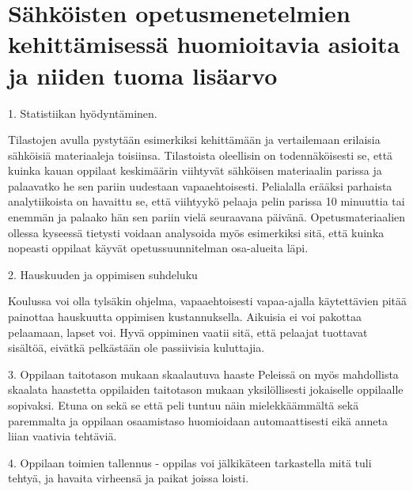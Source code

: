 \documentclass[utf8,bachelor]{gradu3}
\begin{document}
\section{Sähköisten opetusmenetelmien kehittämisessä huomioitavia asioita ja niiden tuoma lisäarvo}


1. Statistiikan hyödyntäminen.

Tilastojen avulla pystytään esimerkiksi kehittämään ja vertailemaan erilaisia sähköisiä materiaaleja toisiinsa. Tilastoista oleellisin on todennäköisesti se, että kuinka kauan oppilaat keskimäärin viihtyvät sähköisen materiaalin parissa ja palaavatko he sen pariin uudestaan vapaaehtoisesti. Pelialalla erääksi parhaista analytiikoista on havaittu se, että viihtyykö pelaaja pelin parissa 10 minuuttia tai enemmän ja palaako hän sen pariin vielä seuraavana päivänä. Opetusmateriaalien ollessa kyseessä tietysti voidaan analysoida myös esimerkiksi sitä, että kuinka nopeasti oppilaat käyvät opetussuunnitelman osa-alueita läpi.



2. Hauskuuden ja oppimisen suhdeluku

Koulussa voi olla tylsäkin ohjelma, vapaaehtoisesti vapaa-ajalla käytettävien pitää painottaa hauskuutta oppimisen kustannuksella.
Aikuisia ei voi pakottaa pelaamaan, lapset voi. Hyvä oppiminen vaatii sitä, että pelaajat tuottavat sisältöä, eivätkä pelkästään ole passiivisia kuluttajia.


3. Oppilaan taitotason mukaan skaalautuva haaste 
Peleissä on myös mahdollista skaalata haastetta oppilaiden taitotason mukaan yksilöllisesti jokaiselle oppilaalle sopivaksi. Etuna on sekä se että peli tuntuu näin mielekkäämmältä sekä paremmalta ja oppilaan osaamistaso huomioidaan automaattisesti eikä anneta liian vaativia tehtäviä. \parencite[][]{koulunArki} \parencite[][13-14]{gamePaper}


4. Oppilaan toimien tallennus - oppilas voi jälkikäteen tarkastella mitä tuli tehtyä, ja havaita virheensä ja paikat joissa loisti.
\end{document}
